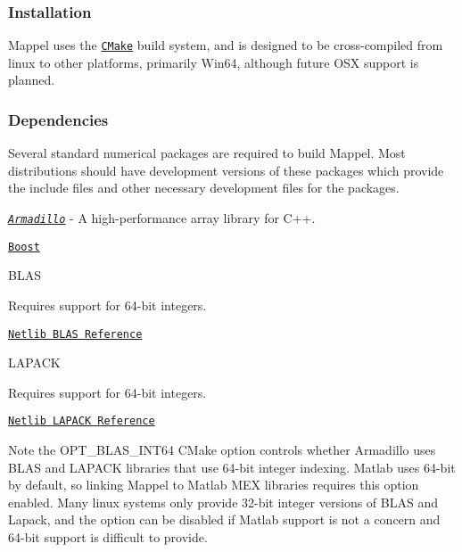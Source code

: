 \subsubsection*{Installation}

Mappel uses the \href{https://cmake.org/cmake/help/latest/}{\tt C\+Make} build system, and is designed to be cross-\/compiled from linux to other platforms, primarily Win64, although future O\+SX support is planned.

\subsubsection*{Dependencies}

Several standard numerical packages are required to build Mappel. Most distributions should have development versions of these packages which provide the include files and other necessary development files for the packages.


\begin{DoxyItemize}
\item \href{http://arma.sourceforge.net/docs.html}{\tt {\itshape Armadillo}} -\/ A high-\/performance array library for C++.
\item \href{http://www.boost.org/}{\tt Boost}
\item B\+L\+AS
\begin{DoxyItemize}
\item Requires support for 64-\/bit integers.
\item \href{http://www.netlib.org/blas/}{\tt Netlib B\+L\+AS Reference}
\end{DoxyItemize}
\item L\+A\+P\+A\+CK
\begin{DoxyItemize}
\item Requires support for 64-\/bit integers.
\item \href{http://www.netlib.org/lapack/}{\tt Netlib L\+A\+P\+A\+CK Reference}
\end{DoxyItemize}
\end{DoxyItemize}

Note the {\ttfamily O\+P\+T\+\_\+\+B\+L\+A\+S\+\_\+\+I\+N\+T64} C\+Make option controls whether Armadillo uses B\+L\+AS and L\+A\+P\+A\+CK libraries that use 64-\/bit integer indexing. Matlab uses 64-\/bit by default, so linking Mappel to Matlab M\+EX libraries requires this option enabled. Many linux systems only provide 32-\/bit integer versions of B\+L\+AS and Lapack, and the option can be disabled if Matlab support is not a concern and 64-\/bit support is difficult to provide.

